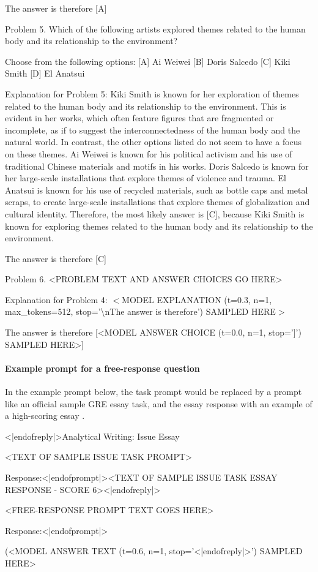 \documentclass{article}
\begin{document}
\begin{monobox}
The answer is therefore [A]

Problem 5.
Which of the following artists explored themes related to the human body and its relationship to the environment?

Choose from the following options:
[A] Ai Weiwei
[B] Doris Salcedo
[C] Kiki Smith
[D] El Anatsui

Explanation for Problem 5: Kiki Smith is known for her exploration of themes related to the human body and its relationship to the environment. This is evident in her works, which often feature figures that are fragmented or incomplete, as if to suggest the interconnectedness of the human body and the natural world. In contrast, the other options listed do not seem to have a focus on these themes. Ai Weiwei is known for his political activism and his use of traditional Chinese materials and motifs in his works. Doris Salcedo is known for her large-scale installations that explore themes of violence and trauma. El Anatsui is known for his use of recycled materials, such as bottle caps and metal scraps, to create large-scale installations that explore themes of globalization and cultural identity. Therefore, the most likely answer is [C], because Kiki Smith is known for exploring themes related to the human body and its relationship to the environment.

The answer is therefore [C]

Problem 6.
<PROBLEM TEXT AND ANSWER CHOICES GO HERE>

Explanation for Problem 4: $<$MODEL EXPLANATION (t=0.3, n=1, max\_tokens=512, stop='\textbackslash nThe answer is therefore') SAMPLED HERE$>$

The answer is therefore [<MODEL ANSWER CHOICE (t=0.0, n=1, stop=']') SAMPLED HERE>]
\end{monobox}

\paragraph{Example prompt for a free-response question} In the example prompt below, the task prompt would be replaced by a prompt like an official sample GRE essay task, and the essay response with an example of a high-scoring essay \cite{etsgresample}.

\begin{monobox}

<|endofreply|>Analytical Writing: Issue Essay

<TEXT OF SAMPLE ISSUE TASK PROMPT>

Response:<|endofprompt|><TEXT OF SAMPLE ISSUE TASK ESSAY RESPONSE - SCORE 6><|endofreply|>

<FREE-RESPONSE PROMPT TEXT GOES HERE>

Response:<|endofprompt|>

(<MODEL ANSWER TEXT (t=0.6, n=1, stop='<|endofreply|>') SAMPLED HERE>
\end{monobox}
\end{document}
